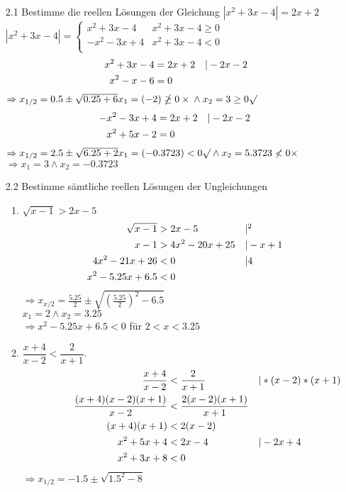 \documentclass[12pt,letterpaper]{article}
\newcommand{\alignleft}[1]{\tag*{\llap{\makebox[\linewidth][l]{$#1$}}}}
\newcommand{\LLeftrightarrow}{ \alignleft{\Leftrightarrow}}
\newcommand{\eqinfo}[1]{&\makebox[2cm][l]{$\vert #1$}}
\newcommand{\Eqn}[3]{#1 &#2 #3}
\newcommand{\eqn}[2]{\LLeftrightarrow\Eqn{#1}{=}{#2}\\}
\newcommand{\eqnfi}[3]{\Eqn{#1}{=}{#2}\eqinfo{#3}\\}
\newcommand{\geqn}[3]{\LLeftrightarrow\Eqn{#1}{#2}{#3}\\}
\newcommand{\geqni}[4]{\LLeftrightarrow\Eqn{#1}{#2}{#3}\eqinfo{#4}\\}
\newcommand{\geqnfi}[4]{\Eqn{#1}{#2}{#3}\eqinfo{#4}\\}
\begin{document}
\begin{enumerate}
\item [2.1] Bestimme die reellen Lösungen der Gleichung $|x^2+3x-4|=2x+2$\\
$|x^2+3x-4| = \begin{cases}
x^2+3x-4 &x^2+3x-4\geq 0\\
-x^2-3x+4 &x^2+3x-4<0\\
\end{cases}$\\
\begin{align*}
\eqnfi{x^2+3x-4}{2x+2}{-2x-2}
\eqn{x^2-x-6}{0}
\end{align*}
$\Rightarrow x_{1/2} = 0.5\pm\sqrt{0.25+6}\\
x_1=(-2)\ngeq 0 \times\\ \land x_2=3 \geq 0 \surd$
\begin{align*}
\eqnfi{-x^2-3x+4}{2x+2}{-2x-2}
\eqn{x^2+5x-2}{0}
\end{align*}
$\Rightarrow x_{1/2} = 2.5\pm\sqrt{6.25+2}\\
x_1=(-0.3723)< 0 \surd\\ \land x_2=5.3723 \nless 0 \times$
$\Rightarrow x_1=3 \land x_2=-0.3723$
\item [2.2] Bestimme sämtliche reellen Lösungen der Ungleichungen\\
\begin{enumerate}
\item $\sqrt{x-1}>2x-5$\\
\begin{align*}
\geqnfi{\sqrt{x-1}}{>}{2x-5}{^2}
\geqni{x-1}{>}{4x^2-20x+25}{-x+1}
\geqni{4x^2-21x+26}{<}{0}{4}
\geqn{x^2-5.25x+6.5}{<}{0}
\end{align*}
$\Rightarrow x_{x/2}= \frac{5.25}{2}\pm\sqrt{(\frac{5.25}{2})^2-6.5}$\\
$x_1=2 \land x_2=3.25$\\
$\Rightarrow x^2-5.25x+6.5<0$ für $2<x<3.25$\\
\item $\dfrac{x+4}{x-2}<\dfrac{2}{x+1}$.\\
\begin{align*}
\geqnfi{\frac{x+4}{x-2}}{<}{\frac{2}{x+1}}{*(x-2)*(x+1)}
\geqn{\frac{(x+4)(x-2)(x+1)}{x-2}}{<}{\frac{2(x-2)(x+1)}{x+1}}
\geqn{(x+4)(x+1)}{<}{2(x-2)}
\geqni{x^2+5x+4}{<}{2x-4}{-2x+4}
\geqn{x^2+3x+8}{<}{0}
\end{align*}
$\Rightarrow x_{1/2} = -1.5\pm\sqrt{1.5^2-8}$
\end{enumerate}
\end{enumerate}
\end{document}
